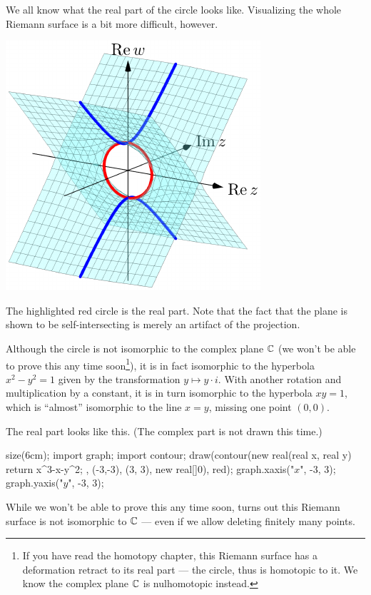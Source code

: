 \begin{example}
	We all know what the real part of the circle looks like. Visualizing the whole Riemann surface
	is a bit more difficult, however.
	\begin{center}
		\includegraphics{3dfigures/pdf/circle.pdf}
	\end{center}
	The highlighted red circle is the real part.
	Note that the fact that the plane is shown to be self-intersecting is merely an artifact of the
	projection.

	Although the circle is not isomorphic to the complex plane $\mathbb C$ (we won't be able to prove this
	any time soon\footnote{%
	If you have read the homotopy chapter, this Riemann surface has a deformation retract to its
	real part --- the circle, thus is homotopic to it. We know the complex plane $\mathbb C$ is
	nulhomotopic instead.}),
	it is in fact isomorphic to the hyperbola $x^2-y^2 = 1$
	given by the transformation $y \mapsto y \cdot i$.
	With another rotation and multiplication by a constant,
	it is in turn isomorphic to the hyperbola $xy = 1$,
	which is ``almost'' isomorphic to the line $x = y$, missing one point $(0, 0)$.
\end{example}

\begin{example}[The elliptic curve $y^2 = x^3 - x$]
	The real part looks like this. (The complex part is not drawn this time.)
	\begin{center}
		\begin{asy}
			size(6cm);
			import graph;
			import contour;
			draw(contour(new real(real x, real y){ return x^3-x-y^2; }, (-3,-3), (3, 3),  new real[]{0}), red);
			graph.xaxis("$x$", -3, 3);
			graph.yaxis("$y$", -3, 3);
		\end{asy}
	\end{center}

	While we won't be able to prove this any time soon, turns out this Riemann surface is not
	isomorphic to $\mathbb C$ --- even if we allow deleting finitely many points.
\end{example}

